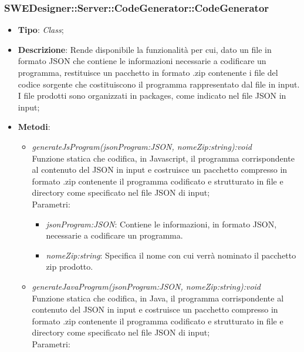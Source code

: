 \documentclass[../DefinizioneDiProdotto.tex]{subfiles}
\begin{document}
			\subsubsection{SWEDesigner::Server::CodeGenerator::CodeGenerator}
			\hypertarget{SWEDesigner::Server::CodeGenerator::CodeGenerator}{}
			\begin{itemize}
				\item \textbf{Tipo}: \emph{Class};\\
				\item \textbf{Descrizione}: Rende disponibile la funzionalità per cui, dato un file in formato JSON che contiene le informazioni necessarie a codificare un programma, restituisce un pacchetto in formato .zip contenente i file del codice sorgente che costituiscono il programma rappresentato dal file in input. I file prodotti sono organizzati in packages, come indicato nel file JSON in input;\\
				\item \textbf{Metodi}:
				\begin{itemize}
					\item \emph{generateJsProgram(jsonProgram:JSON, nomeZip:string):void} \\ 
					Funzione statica che codifica, in Javascript, il programma corrispondente al contenuto del JSON in input e costruisce un pacchetto compresso in formato .zip contenente
					il programma codificato e strutturato in file e directory come specificato nel file JSON di input; \\
					Parametri:
					\begin{itemize}
						\item \emph{jsonProgram:JSON}: Contiene le informazioni, in formato JSON, necessarie a codificare un programma.\\
						\item \emph{nomeZip:string}: Specifica il nome con cui verrà nominato il pacchetto zip prodotto.\\
					\end{itemize}					
					\item \emph{generateJavaProgram(jsonProgram:JSON, nomeZip:string):void} \\ 
					Funzione statica che codifica, in Java, il programma corrispondente al contenuto del JSON in input e costruisce un pacchetto compresso in formato .zip contenente il programma codificato e strutturato in file e directory come specificato nel file JSON di input; \\							
					Parametri:
					\begin{itemize}

\end{itemize}
\end{itemize}
\end{itemize}
\end{document}
